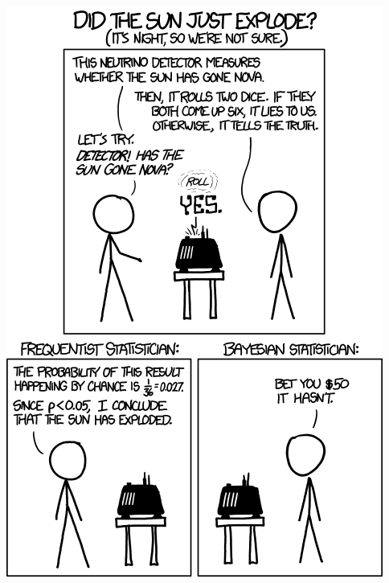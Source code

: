 \documentclass{beamer}
\begin{document}
\begin{frame}{}
\begin{center}
        \includegraphics[height=.9\paperheight]{figures/frequentists_vs_bayesians.png}
\end{center}
\end{frame}
\end{document}
